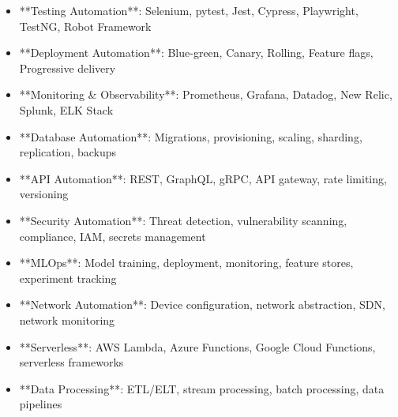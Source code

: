 \documentclass[11pt,a4paper]{article}
\begin{document}
\begin{itemize}
\item **Testing Automation**: Selenium, pytest, Jest, Cypress, Playwright, TestNG, Robot Framework
\end{itemize}

\begin{itemize}
\item **Deployment Automation**: Blue-green, Canary, Rolling, Feature flags, Progressive delivery
\end{itemize}

\begin{itemize}
\item **Monitoring & Observability**: Prometheus, Grafana, Datadog, New Relic, Splunk, ELK Stack
\end{itemize}

\begin{itemize}
\item **Database Automation**: Migrations, provisioning, scaling, sharding, replication, backups
\end{itemize}

\begin{itemize}
\item **API Automation**: REST, GraphQL, gRPC, API gateway, rate limiting, versioning
\end{itemize}

\begin{itemize}
\item **Security Automation**: Threat detection, vulnerability scanning, compliance, IAM, secrets management
\end{itemize}

\begin{itemize}
\item **MLOps**: Model training, deployment, monitoring, feature stores, experiment tracking
\end{itemize}

\begin{itemize}
\item **Network Automation**: Device configuration, network abstraction, SDN, network monitoring
\end{itemize}

\begin{itemize}
\item **Serverless**: AWS Lambda, Azure Functions, Google Cloud Functions, serverless frameworks
\end{itemize}

\begin{itemize}
\item **Data Processing**: ETL/ELT, stream processing, batch processing, data pipelines
\end{itemize}
\end{document}
